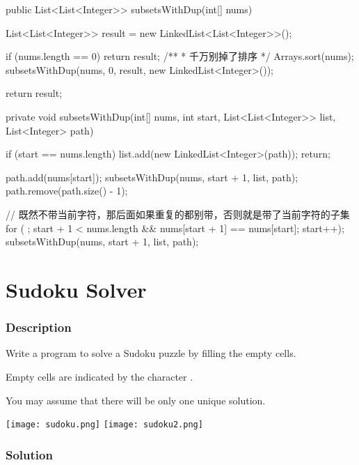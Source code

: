 \begin{Code}
public List<List<Integer>> subsetsWithDup(int[] nums) {
    List<List<Integer>> result = new LinkedList<List<Integer>>();

    if (nums.length == 0) {
        return result;
    }
    /**
     * 千万别掉了排序
     */
    Arrays.sort(nums);
    subsetsWithDup(nums, 0, result, new LinkedList<Integer>());

    return result;
}

private void subsetsWithDup(int[] nums, int start, List<List<Integer>> list, List<Integer> path) {
    if (start == nums.length) {
        list.add(new LinkedList<Integer>(path));
        return;
    }

    path.add(nums[start]);
    subsetsWithDup(nums, start + 1, list, path);
    path.remove(path.size() - 1);

    // 既然不带当前字符，那后面如果重复的都别带，否则就是带了当前字符的子集
    for ( ; start + 1 < nums.length && nums[start + 1] == nums[start]; start++);
    subsetsWithDup(nums, start + 1, list, path);
}
\end{Code}

\newpage

\section{Sudoku Solver} %

\subsubsection{Description}

Write a program to solve a Sudoku puzzle by filling the empty cells.

Empty cells are indicated by the character .

You may assume that there will be only one unique solution.

\begin{center}
\texttt{[image: sudoku.png]}
\texttt{[image: sudoku2.png]}
\end{center}

\subsubsection{Solution}

